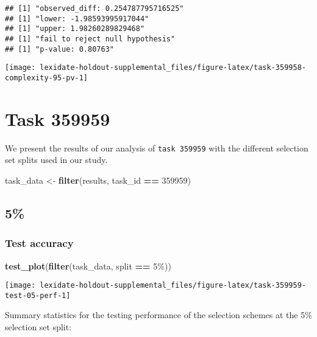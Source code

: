\documentclass[
]{book}
\newenvironment{Shaded}{\begin{snugshade}}{\end{snugshade}}
\newcommand{\DecValTok}[1]{\textcolor[rgb]{0.00,0.00,0.81}{#1}}
\newcommand{\FunctionTok}[1]{\textcolor[rgb]{0.13,0.29,0.53}{\textbf{#1}}}
\newcommand{\NormalTok}[1]{#1}
\newcommand{\OtherTok}[1]{\textcolor[rgb]{0.56,0.35,0.01}{#1}}
\newcommand{\SpecialCharTok}[1]{\textcolor[rgb]{0.81,0.36,0.00}{\textbf{#1}}}
\newcommand{\StringTok}[1]{\textcolor[rgb]{0.31,0.60,0.02}{#1}}
\begin{document}
\begin{verbatim}
## [1] "observed_diff: 0.254787795716525"
## [1] "lower: -1.98593995917044"
## [1] "upper: 1.98260289829468"
## [1] "fail to reject null hypothesis"
## [1] "p-value: 0.80763"
\end{verbatim}

\texttt{[image: lexidate-holdout-supplemental\_files/figure-latex/task-359958-complexity-95-pv-1]}

\hypertarget{task-359959}{%
\chapter{Task 359959}\label{task-359959}}

We present the results of our analysis of \texttt{task\ 359959} with the different selection set splits used in our study.

\begin{Shaded}
\begin{Highlighting}[]
\NormalTok{task\_data }\OtherTok{\textless{}{-}} \FunctionTok{filter}\NormalTok{(results, task\_id }\SpecialCharTok{==} \DecValTok{359959}\NormalTok{)}
\end{Highlighting}
\end{Shaded}

\hypertarget{section-35}{%
\section{5\%}\label{section-35}}

\hypertarget{test-accuracy-35}{%
\subsection{Test accuracy}\label{test-accuracy-35}}

\begin{Shaded}
\begin{Highlighting}[]
\FunctionTok{test\_plot}\NormalTok{(}\FunctionTok{filter}\NormalTok{(task\_data, split }\SpecialCharTok{==} \StringTok{\textquotesingle{}5\%\textquotesingle{}}\NormalTok{))}
\end{Highlighting}
\end{Shaded}

\texttt{[image: lexidate-holdout-supplemental\_files/figure-latex/task-359959-test-05-perf-1]}

Summary statistics for the testing performance of the selection schemes at the 5\% selection set split:
\end{document}
